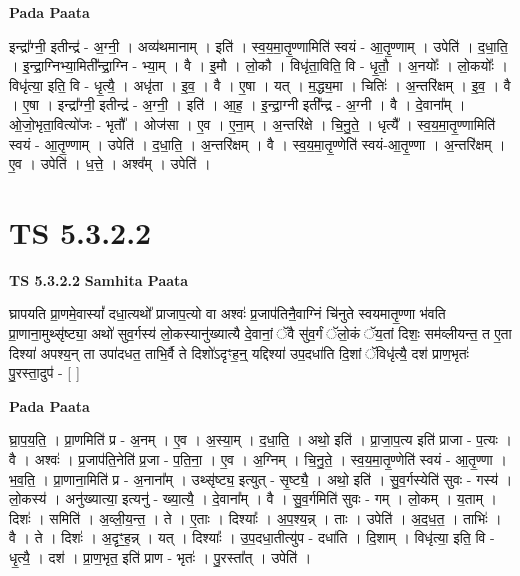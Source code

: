 \documentclass[17pt]{extarticle}
\begin{document}
\textbf{Pada Paata} \newline

इन्द्रा᳚ग्नी॒ इतीन्द्र॑ - अ॒ग्नी॒ । अव्य॑थमानाम् । इति॑ । स्व॒य॒मा॒तृ॒ण्णामिति॑ स्वयं - आ॒तृ॒ण्णाम् । उपेति॑ । द॒धा॒ति॒ । इ॒न्द्रा॒ग्निभ्या॒मिती᳚न्द्रा॒ग्नि - भ्या॒म् । वै । इ॒मौ । लो॒कौ । विधृ॑ता॒विति॒ वि - धृ॒तौ॒ । अ॒नयोः᳚ । लो॒कयोः᳚ । विधृ॑त्या॒ इति॒ वि - धृ॒त्यै॒ । अधृ॑ता । इ॒व॒ । वै । ए॒षा । यत् । म॒द्ध्य॒मा । चितिः॑ । अ॒न्तरि॑क्षम् । इ॒व॒ । वै । ए॒षा । इन्द्रा᳚ग्नी॒ इतीन्द्र॑ - अ॒ग्नी॒ । इति॑ । आ॒ह॒ । इ॒न्द्रा॒ग्नी इती᳚न्द्र - अ॒ग्नी । वै । दे॒वाना᳚म् । ओ॒जो॒भृता॒वित्यो॑जः - भृतौ᳚ । ओज॑सा । ए॒व । ए॒ना॒म् । अ॒न्तरि॑क्षे । चि॒नु॒ते॒ । धृत्यै᳚ । स्व॒य॒मा॒तृ॒ण्णामिति॑ स्वयं - आ॒तृ॒ण्णाम् । उपेति॑ । द॒धा॒ति॒ । अ॒न्तरि॑क्षम् । वै । स्व॒य॒मा॒तृ॒ण्णेति॑ स्वयं-आ॒तृ॒ण्णा । अ॒न्तरि॑क्षम् । ए॒व । उपेति॑ । ध॒त्ते॒ । अश्व᳚म् । उपेति॑ ।  \newline





\section{ TS 5.3.2.2 }

\textbf{TS 5.3.2.2 } \newline
\textbf{Samhita Paata} \newline

घ्रापयति प्रा॒णमे॒वास्यां᳚ दधा॒त्यथो᳚ प्राजाप॒त्यो वा अश्वः॑ प्र॒जाप॑तिनै॒वाग्निं चि॑नुते स्वयमातृ॒ण्णा भ॑वति प्रा॒णाना॒मुथ्सृ॑ष्ट्या॒ अथो॑ सुव॒र्गस्य॑ लो॒कस्यानु॑ख्यात्यै दे॒वानां॒ ॅवै सु॑व॒र्गं ॅलो॒कं ॅय॒तां दिशः॒ सम॑व्लीयन्त॒ त ए॒ता दिश्या॑ अपश्य॒न् ता उपा॑दधत॒ ताभि॒र्वै ते दिशो॑ऽदृꣳह॒न्॒ यद्दिश्या॑ उप॒दधा॑ति दि॒शां ॅविधृ॑त्यै॒ दश॑ प्राण॒भृतः॑ पु॒रस्ता॒दुप॑ - [  ] \newline

\textbf{Pada Paata} \newline

घ्रा॒प॒य॒ति॒ । प्रा॒णमिति॑ प्र - अ॒नम् । ए॒व । अ॒स्या॒म् । द॒धा॒ति॒ । अथो॒ इति॑ । प्रा॒जा॒प॒त्य इति॑ प्राजा - प॒त्यः । वै । अश्वः॑ । प्र॒जाप॑ति॒नेति॑ प्र॒जा - प॒ति॒ना॒ । ए॒व । अ॒ग्निम् । चि॒नु॒ते॒ । स्व॒य॒मा॒तृ॒ण्णेति॑ स्वयं - आ॒तृ॒ण्णा । भ॒व॒ति॒ । प्रा॒णाना॒मिति॑ प्र - अ॒नाना᳚म् । उथ्सृ॑ष्ट्य॒ इत्युत् - सृ॒ष्ट्यै॒ । अथो॒ इति॑ । सु॒व॒र्गस्येति॑ सुवः - गस्य॑ । लो॒कस्य॑ । अनु॑ख्यात्या॒ इत्यनु॑ - ख्या॒त्यै॒ । दे॒वाना᳚म् । वै । सु॒व॒र्गमिति॑ सुवः - गम् । लो॒कम् । य॒ताम् । दिशः॑ । समिति॑ । अ॒व्ली॒य॒न्त॒ । ते । ए॒ताः । दिश्याः᳚ । अ॒प॒श्य॒न्न् । ताः । उपेति॑ । अ॒द॒ध॒त॒ । ताभिः॑ । वै । ते । दिशः॑ । अ॒दृꣳ॒॒ह॒न्न् । यत् । दिश्याः᳚ । उ॒प॒दधा॒तीत्यु॑प - दधा॑ति । दि॒शाम् । विधृ॑त्या॒ इति॒ वि - धृ॒त्यै॒ । दश॑ । प्रा॒ण॒भृत॒ इति॑ प्राण - भृतः॑ । पु॒रस्ता᳚त् । उपेति॑ ।  \newline
\end{document}
